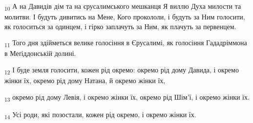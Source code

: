 \begin{tcolorbox}
\textsubscript{10} А на Давидів дім та на єрусалимського мешканця Я виллю Духа милости та молитви. І будуть дивитись на Мене, Кого прокололи, і будуть за Ним голосити, як голоситься за одинцем, і гірко заплачуть за Ним, як плачуть за первенцем.
\end{tcolorbox}
\begin{tcolorbox}
\textsubscript{11} Того дня здійметься велике голосіння в Єрусалимі, як голосіння Гададріммона в Меґіддонській долині.
\end{tcolorbox}
\begin{tcolorbox}
\textsubscript{12} І буде земля голосити, кожен рід окремо: окремо рід дому Давида, і окремо жінки їх, окремо рід дому Натана, й окремо жінки їх,
\end{tcolorbox}
\begin{tcolorbox}
\textsubscript{13} окремо рід дому Левія, і окремо жінки їх, окремо рід Шім'ї, і окремо жінки їх.
\end{tcolorbox}
\begin{tcolorbox}
\textsubscript{14} Усі роди, які позостали, кожен рід окремо, і окремо жінки їх.
\end{tcolorbox}
